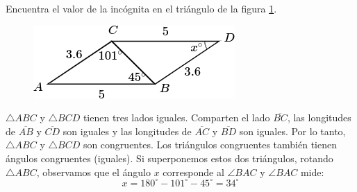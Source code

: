 Encuentra el valor de la incógnita en el triángulo de la figura \ref{fig:angle_triangle_19}.

\begin{minipage}[t][][t]{0.35\textwidth}
    \begin{figure}[H]
        \centering
        \includegraphics[width=\linewidth]{../images/angle_triangle_19.png}
        \caption{}
        \label{fig:angle_triangle_19}
    \end{figure}
\end{minipage}\hfill
\begin{minipage}[t][][t]{0.6\textwidth}
    \begin{solutionbox}{4.5cm}
        $\triangle ABC$ y $\triangle BCD$ tienen tres lados iguales. Comparten el lado
        $\overline{BC}$, las longitudes de $\overline{AB}$ y $\overline{CD}$ son iguales y las longitudes de
        $\overline{AC}$ y $\overline{BD}$ son iguales. Por lo tanto,
        $\triangle ABC$ y $\triangle BCD$  son congruentes.
        Los triángulos congruentes también tienen ángulos congruentes (iguales). Si superponemos estos dos triángulos, rotando
        $\triangle ABC$, observamos que el ángulo $x$ corresponde al
        $\angle BAC$ y $\angle BAC$ mide: \[x=180^\circ-101^\circ-45^\circ=34^\circ\]
    \end{solutionbox}
\end{minipage}
